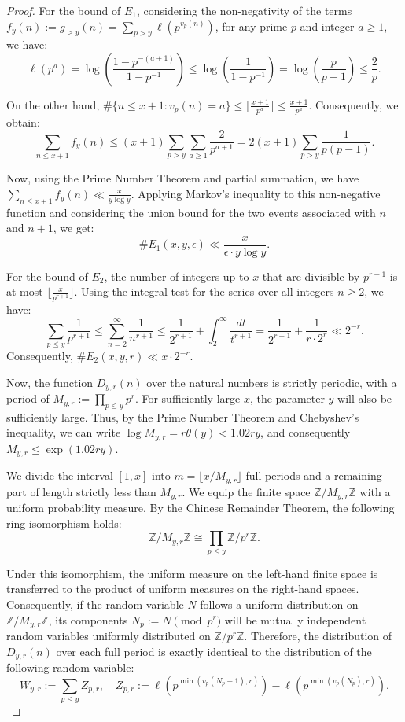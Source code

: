 \documentclass[10pt,a4paper]{amsart}
\begin{document}
\begin{proof}
For the bound of $E_1$, considering the non-negativity of the terms $f_y(n) := g_{>y}(n) = \sum_{p > y} \ell(p^{v_p(n)})$, for any prime $p$ and integer $a \geq 1$, we have:
\[ \ell(p^a) = \log \left( \frac{1 - p^{-(a+1)}}{1 - p^{-1}} \right) \leq \log \left(\frac{1}{1 - p^{-1}}\right) = \log \left(\frac{p}{p - 1}\right) \leq \frac{2}{p}. \]

On the other hand, $\text{\#}\{n \leq x + 1 : v_p(n) = a\} \leq \lfloor \frac{x+1}{p^a} \rfloor \leq \frac{x+1}{p^a}$. Consequently, we obtain:
\[ \sum_{n \leq x+1} f_y(n) \leq (x + 1) \sum_{p > y} \sum_{a \geq 1} \frac{2}{p^{a+1}} = 2(x + 1) \sum_{p > y} \frac{1}{p(p - 1)}. \]

Now, using the Prime Number Theorem and partial summation, we have $\sum_{n \leq x+1} f_y(n) \ll \frac{x}{y \log y}$. Applying Markov's inequality to this non-negative function and considering the union bound for the two events associated with $n$ and $n + 1$, we get:
\[ \text{\#}E_1(x, y, \epsilon) \ll \frac{x}{\epsilon \cdot y \log y}. \]

For the bound of $E_2$, the number of integers up to $x$ that are divisible by $p^{r+1}$ is at most $\lfloor \frac{x}{p^{r+1}} \rfloor$. Using the integral test for the series over all integers $n \geq 2$, we have:
\[ \sum_{p \leq y} \frac{1}{p^{r+1}} \leq \sum_{n=2}^{\infty} \frac{1}{n^{r+1}} \leq \frac{1}{2^{r+1}} + \int_{2}^{\infty} \frac{dt}{t^{r+1}} = \frac{1}{2^{r+1}} + \frac{1}{r \cdot 2^r} \ll 2^{-r}. \]
Consequently, $\text{\#}E_2(x, y, r) \ll x \cdot 2^{-r}$.

Now, the function $D_{y,r}(n)$ over the natural numbers is strictly periodic, with a period of $M_{y,r} := \prod_{p \leq y} p^r$. For sufficiently large $x$, the parameter $y$ will also be sufficiently large. Thus, by the Prime Number Theorem and Chebyshev's inequality, we can write $\log M_{y,r} = r\theta(y) < 1.02ry$, and consequently $M_{y,r} \leq \exp(1.02ry)$.

We divide the interval $[1, x]$ into $m = \lfloor x / M_{y,r} \rfloor$ full periods and a remaining part of length strictly less than $M_{y,r}$. We equip the finite space $\mathbb{Z}/M_{y,r}\mathbb{Z}$ with a uniform probability measure. By the Chinese Remainder Theorem, the following ring isomorphism holds:
\[ \mathbb{Z}/M_{y,r}\mathbb{Z} \cong \prod_{p \leq y} \mathbb{Z}/p^r\mathbb{Z}. \]

Under this isomorphism, the uniform measure on the left-hand finite space is transferred to the product of uniform measures on the right-hand spaces. Consequently, if the random variable $N$ follows a uniform distribution on $\mathbb{Z}/M_{y,r}\mathbb{Z}$, its components $N_p := N \pmod{p^r}$ will be mutually independent random variables uniformly distributed on $\mathbb{Z}/p^r\mathbb{Z}$. Therefore, the distribution of $D_{y,r}(n)$ over each full period is exactly identical to the distribution of the following random variable:
\[ W_{y,r} := \sum_{p \leq y} Z_{p,r}, \quad Z_{p,r} := \ell\left(p^{\min(v_p(N_p + 1), r)}\right) - \ell\left(p^{\min(v_p(N_p), r)}\right). \]


\end{proof}
\end{document}
